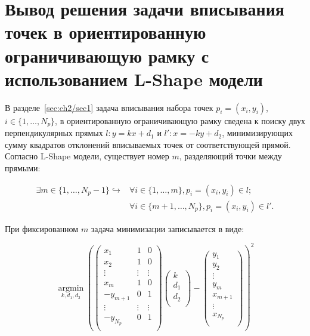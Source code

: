 \chapter{Вывод решения задачи вписывания точек в ориентированную ограничивающую рамку с использованием L-Shape модели}\label{app:math/lshape}

В разделе~\cref{sec:ch2/sec1} задача вписывания набора точек $p_i = (x_i, y_i)$, $i \in \{1,\dots,N_p\}$, в ориентированную ограничивающую рамку сведена к поиску двух перпендикулярных прямых $l: y = kx + d_1$ и $l': x = -ky + d_2$, минимизирующих сумму квадратов отклонений вписываемых точек от соответствующей прямой. Согласно L-Shape модели, существует номер $m$, разделяющий точки между прямыми:

\begin{equation}
	\begin{aligned}
		\exists m \in \{1,\dots,N_p - 1\}\hookrightarrow& \forall i \in \{1,\dots,m\}, p_i = (x_i, y_i) \in l;\\
		&\forall i \in \{m+1,\dots,N_p\},p_i = (x_i, y_i) \in l'.
	\end{aligned}
	\label{eq:lshape_split}
\end{equation}

При фиксированном $m$ задача минимизации записывается в виде:

\begin{equation}
	\operatorname*{argmin}_{k, d_1,d_2}\left(\begin{pmatrix}
		x_1 & 1 & 0 \\
		x_2 & 1 & 0 \\
		\vdots & \vdots  & \vdots  \\
		x_{m} & 1 & 0 \\
		-y_{m + 1} & 0 & 1 \\
		\vdots & \vdots  & \vdots  \\
		-y_{N_p} & 0 & 1 \\
	\end{pmatrix}
	\begin{pmatrix}
		k \\
		d_1\\
		d_2 \\
	\end{pmatrix} - \begin{pmatrix}
		y_1 \\
		y_2\\
		\vdots \\
		y_{m} \\
		x_{m + 1} \\
		\vdots \\
		x_{N_p} \\
	\end{pmatrix}\right)^2
	\label{eq:lshape_argmin_full}
\end{equation}

